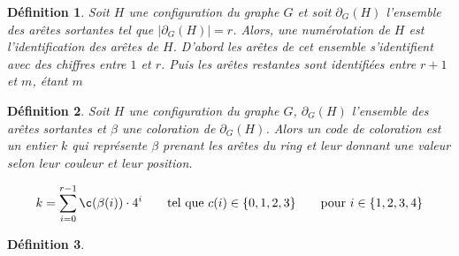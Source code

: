 \documentclass[10pt,a4paper]{article}
\newtheorem{definition}{Définition}
\begin{document}

\begin{definition}
Soit $H$ une configuration du graphe $G$ et soit $\partial_G(H)$ l'ensemble des arêtes sortantes tel que $|\partial_G(H)|=r$. Alors, une \emph{numérotation} de $H$ est l'identification des arêtes de $H$. D'abord les arêtes de cet ensemble s'identifient avec des chiffres  entre $1$ et $r$. Puis les arêtes restantes sont identifiées entre $r+1$ et $m$, étant $m$
\end{definition}

\begin{definition}
Soit $H$ une configuration du graphe $G$, $\partial_G(H)$ l'ensemble des arêtes sortantes et $\beta$ une coloration de $\partial_G(H)$. Alors un \emph{code de coloration} est un entier $k$ qui représente $\beta$ prenant les arêtes du ring et leur donnant une valeur selon leur couleur et leur position.

$$
k = \sum_{i=0}^{r-1} \c(\beta(i)) \cdot 4^{i} \qquad \textrm{tel que   } c(i) \in \{ 0,1,2,3 \} \qquad \textrm{pour  } i \in \{1,2,3,4 \}
$$
\label{de:code}
\end{definition}

\begin{definition}

\end{definition}


\end{document}
